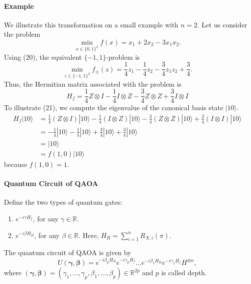 \documentclass[
        11pt, %
	a4paper, %
]{LegrandOrangeBook}
\begin{document}

\paragraph{Example}
We illustrate this transformation on a small example with $n=2$. Let us consider the problem
\begin{equation}
    \min _{x \in\{0,1\}^{2}} f(x)=x_{1}+2 x_{2}-3 x_{1} x_{2}.
\end{equation}
Using (20), the equivalent $\{-1,1\}$-problem is
\begin{equation}
    \min _{z \in\{-1,1\}^{2}} f_{ \pm}(z)=\frac{1}{4} z_{1}-\frac{1}{4} z_{2}-\frac{3}{4} z_{1} z_{2}+\frac{3}{4}.
\end{equation}
Thus, the Hermitian matrix associated with the problem is
\begin{equation}
    H_{f}=\frac{1}{4} Z \otimes I-\frac{1}{4} I \otimes Z-\frac{3}{4} Z \otimes Z+\frac{3}{4} I \otimes I
\end{equation}
To illustrate (21), we compute the eigenvalue of the canonical basis state $|10\rangle$.
\begin{equation}
\begin{aligned}
H_{f}|10\rangle & =\frac{1}{4}(Z \otimes I)|10\rangle-\frac{1}{4}(I \otimes Z)|10\rangle-\frac{3}{4}(Z \otimes Z)|10\rangle+\frac{3}{4}(I \otimes I)|10\rangle \\
& =-\frac{1}{4}|10\rangle-\frac{1}{4}|10\rangle+\frac{3}{4}|10\rangle+\frac{3}{4}|10\rangle \\
& =|10\rangle \\
& =f(1,0)|10\rangle
\end{aligned}
\end{equation}
because $f(1,0)=1$.

\paragraph{Quantum Circuit of QAOA}
Define the two types of quantum gates:
\begin{enumerate}
    \item $e^{-i  \gamma H_{f}}$, for any $\gamma \in \mathbb{R}$.
    \item $e^{-i \beta  H_{B} }$, for any $\beta \in \mathbb{R}$. Here, $H_{B}=\sum_{i=1}^{n} R_{X, i}(\pi).$
\end{enumerate}
The quantum circuit of QAOA is given by
\begin{equation}
    U(\boldsymbol{\gamma}, \boldsymbol{\beta})
    = e^{-i \beta_p H_B} e^{-i \gamma_p H_{f}} \ldots e^{-i \beta_1 H_B} e^{-i \gamma_1 H_{f}} H^{\otimes n},
\end{equation}
where $(\boldsymbol{\gamma}, \boldsymbol{\beta})=\left(\gamma_{1}, \ldots, \gamma_{p}, \beta_{1}, \ldots, \beta_{p}\right) \in \mathbb{R}^{2 p}$ and $p$ is called depth.
\end{document}
